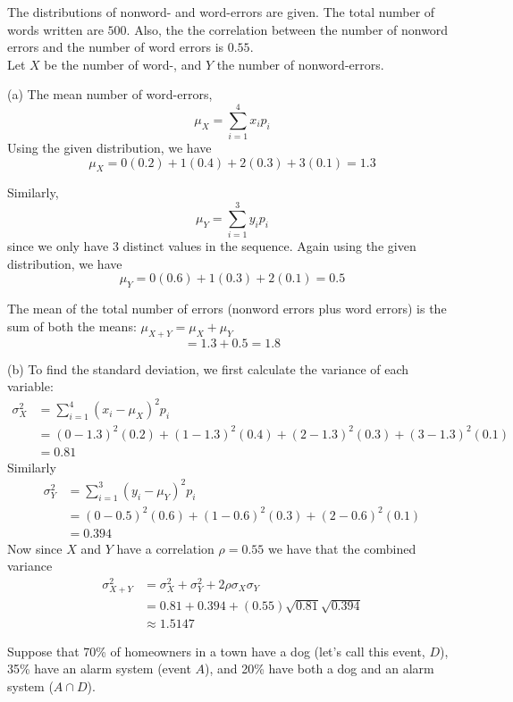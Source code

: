 \documentclass[boxes, qed]{homework}
\begin{document}
\begin{problem}The distributions of nonword- and word-errors are given. 
  The total number of words written are $500$. Also, the 
  the correlation between the number of nonword errors and the number 
  of word errors is $0.55$.\\
  Let $X$ be the number of word-, and $Y$
  the number of nonword-errors.
\end{problem}
\begin{solution}(a) The mean number of word-errors,
  $$\mu_X = \sum_{i=1}^{4}{x_ip_i}$$
  Using the given distribution, we have
  $$\mu_X = 0(0.2) + 1(0.4) + 2(0.3) + 3(0.1) = 1.3$$
  
  Similarly,
  $$\mu_Y = \sum_{i=1}^{3}{y_ip_i}$$
  since we only have 3 distinct values
  in the sequence. Again using the given distribution, we have
  $$\mu_Y = 0(0.6) + 1(0.3) + 2(0.1) = 0.5$$
  
  The mean of the total number of errors 
  (nonword errors plus word errors) is the sum
  of both the means: $\mu_{X+Y} = \mu_X + \mu_Y$
  $$=1.3+0.5 = \boxed{1.8}$$

  (b) To find the standard deviation, we first calculate
  the variance of each variable:
  \begin{align*}
    \sigma_{X}^2 &= \sum_{i=1}^4{(x_i-\mu_X)^2p_i}\\
    &= (0-1.3)^2(0.2)
      + (1-1.3)^2(0.4)
      + (2-1.3)^2(0.3)
      + (3-1.3)^2(0.1)\\
    &= 0.81
  \end{align*}
  Similarly
  \begin{align*}
    \sigma_{Y}^2 &= \sum_{i=1}^3{(y_i-\mu_Y)^2p_i}\\
    &= (0-0.5)^2(0.6)
      + (1-0.6)^2(0.3)
      + (2-0.6)^2(0.1)\\
    &= 0.394
  \end{align*}
  Now since $X$ and $Y$ have a correlation
  $\rho=0.55$ we have that the combined variance
  \begin{align*}
    \sigma_{X+Y}^2 
      &= \sigma_X^2 + \sigma_Y^2 + 2\rho\sigma_X\sigma_Y\\
      &= 0.81 + 0.394 + (0.55)\sqrt{0.81}\sqrt{0.394}\\
      &\boxed{\approx 1.5147}
  \end{align*}
\end{solution}
\begin{problem}Suppose that 70\% of homeowners in a town have a dog
  (let's call this event, $D$), 
  35\% have an alarm system (event $A$), and
  20\% have both a dog and an alarm system ($A\cap{D}$).
\end{problem}
\end{document}
